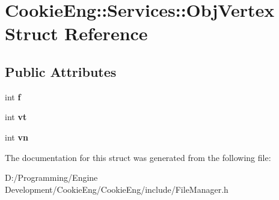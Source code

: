 \hypertarget{struct_cookie_eng_1_1_services_1_1_obj_vertex}{}\section{Cookie\+Eng\+:\+:Services\+:\+:Obj\+Vertex Struct Reference}
\label{struct_cookie_eng_1_1_services_1_1_obj_vertex}
\subsection*{Public Attributes}
\begin{DoxyCompactItemize}
\item 
\mbox{\label{struct_cookie_eng_1_1_services_1_1_obj_vertex_a213f1409c7348ddd3d8b44b415244d63}} 
int {\bfseries f}
\item 
\mbox{\label{struct_cookie_eng_1_1_services_1_1_obj_vertex_a6db96e5efb6b3f81cc6e657140aee591}} 
int {\bfseries vt}
\item 
\mbox{\label{struct_cookie_eng_1_1_services_1_1_obj_vertex_a59e8ce0f7b3afa97b01fb5258b473bd9}} 
int {\bfseries vn}
\end{DoxyCompactItemize}


The documentation for this struct was generated from the following file\+:\begin{DoxyCompactItemize}
\item 
D\+:/\+Programming/\+Engine Development/\+Cookie\+Eng/\+Cookie\+Eng/include/File\+Manager.\+h\end{DoxyCompactItemize}
